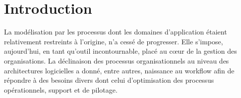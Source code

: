  	 \section{Introduction}
 	  
    
La modélisation par les processus dont les domaines d'application étaient relativement restreints à l'origine, n'a cessé de progresser. Elle s'impose, aujourd'hui, en tant qu'outil incontournable, placé au cœur de la gestion des organisations. La déclinaison des processus organisationnels au niveau des architectures logicielles a donné, entre autres, naissance au workflow afin de répondre à des besoins divers dont celui d'optimisation des processus opérationnels, support et de pilotage.

    